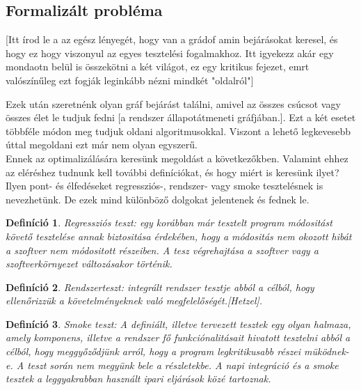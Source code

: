 \documentclass[12pt]{article}
\newtheorem{defin}{Definíció}[section]
\begin{document}
\subsection{Formalizált probléma}
[Itt írod le a az egész lényegét, hogy van a grádof amin bejárásokat keresel, és hogy ez hogy viszonyul az egyes tesztelési fogalmakhoz. Itt igyekezz akár egy mondaotn belül is összekötni a két világot, ez egy kritikus fejezet, emrt valószínűleg ezt fogják leginkább nézni mindkét "oldalról"]







Ezek után szeretnénk olyan gráf bejárást találni, amivel az összes csúcsot vagy összes élet le tudjuk fedni [a rendszer állapotátmeneti gráfjában.].
Ezt a két esetet többféle módon meg tudjuk oldani algoritmusokkal.
Viszont a lehető legkevesebb úttal megoldani ezt már nem olyan egyszerű.\\
Ennek az optimalizálására keresünk megoldást a következőkben.
Valamint ehhez az eléréshez tudnunk kell további definíciókat, és hogy miért is keresünk ilyet?
Ilyen pont- és élfedéseket regressziós-, rendszer- vagy smoke tesztelésnek is nevezhetünk. De ezek mind különböző dolgokat jelentenek és fednek le.\\

\begin{defin}
Regressziós teszt: egy korábban már tesztelt program módositást követő tesztelése annak biztositása érdekében, hogy a módositás nem okozott hibát a szoftver nem módositott részeiben. A tesz végrehajtása a szoftver vagy a szoftverkörnyezet változásakor történik. ~\cite{htb:masterfield}
\end{defin}

\begin{defin}
Rendszerteszt: integrált rendszer tesztje abból a célból, hogy ellenőrizzük a követelményeknek való megfelelőségét.[Hetzel]. ~\cite{htb:masterfield}
\end{defin}

\begin{defin}
Smoke teszt: A definiált, illetve tervezett tesztek egy olyan halmaza, amely komponens, illetve a rendszer fő funkciónalitásait hivatott tesztelni abból a célból, hogy meggyőződjünk arról, hogy a program legkritikusabb részei müködnek-e. A teszt során nem megyünk bele a részletekbe. A napi integráció és a smoke tesztek a leggyakrabban használt ipari eljárások közé tartoznak. ~\cite{htb:masterfield}
\end{defin}
\end{document}
